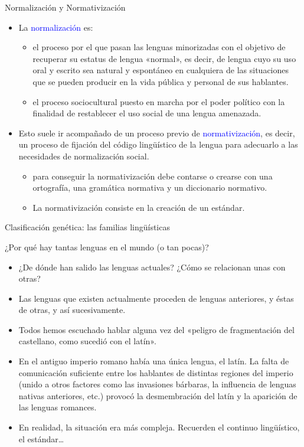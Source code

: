 \documentclass[handout]{beamer}
\begin{document}
\begin{frame}{Normalización y Normativización}

\begin{itemize}
	\item La \textcolor{blue}{normalización} es:
	\begin{itemize}
		\item el proceso por el que pasan las lenguas minorizadas con el objetivo de recuperar su estatus de lengua «normal», es decir, de lengua cuyo su uso oral y escrito sea natural y espontáneo en cualquiera de las situaciones que se pueden producir en la vida pública y personal de sus hablantes.
		\item el proceso sociocultural puesto en marcha por el poder político con la finalidad de restablecer el uso social de una lengua amenazada.
	\end{itemize}
	\item Esto suele ir acompañado de un proceso previo de \textcolor{blue}{normativización}, es decir, un proceso de fijación del código lingüístico de la lengua para adecuarlo a las necesidades de normalización social. 
	\begin{itemize}
		\item para conseguir la normativización debe contarse o crearse con una ortografía, una gramática normativa y un diccionario normativo.
		\item La normativización consiste en la creación de un estándar.
	\end{itemize}
\end{itemize}

\end{frame}


\begin{frame}{}
\begin{center}
\LARGE Clasificación genética: las familias lingüísticas
\end{center}
\end{frame}

\begin{frame}{¿Por qué hay tantas lenguas en el mundo (o tan pocas)?}
\begin{itemize}
	\item ¿De dónde han salido las lenguas actuales? ¿Cómo se relacionan unas con otras?
	\item Las lenguas que existen actualmente proceden de lenguas anteriores, y éstas de otras, y así sucesivamente.
	\item Todos hemos escuchado hablar alguna vez del «peligro de fragmentación del castellano, como sucedió con el latín».
	\item En el antiguo imperio romano había una única lengua, el latín. La falta de comunicación suficiente entre los hablantes de distintas regiones del imperio (unido a otros factores como las invasiones bárbaras, la influencia de lenguas nativas anteriores, etc.) provocó la desmembración del latín y la aparición de las lenguas romances.    
	\item En realidad, la situación era más compleja. Recuerden el continuo lingüístico, el estándar\ldots 
\end{itemize}
\end{frame}
\end{document}
